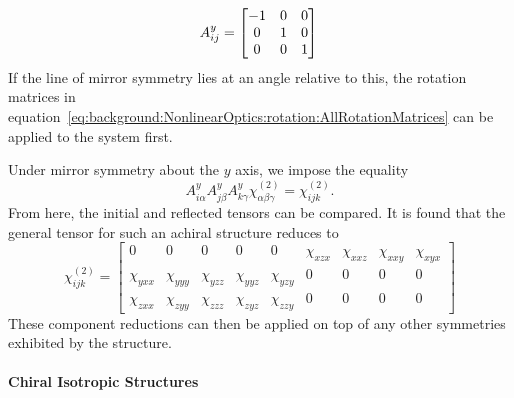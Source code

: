 \begin{equation}\label{eq:background:NonlinearOptics:mirror:yReflect}
	A^{y}_{ij} =
	\begin{bmatrix}
		-1 & 0 & 0\\ 
		0 & 1 & 0\\ 
		0 & 0 & 1
	\end{bmatrix}\\	
\end{equation}
If the line of mirror symmetry lies at an angle relative to this, the rotation matrices in equation~\ref{eq:background:NonlinearOptics:rotation:AllRotationMatrices} can be applied to the system first. 

Under mirror symmetry about the $y$ axis, we impose the equality
\begin{equation}\label{eq:background:NonlinearOptics:mirror:MirrorSymmetry}
	A^{y}_{i\alpha}A^{y}_{j\beta}A^{y}_{k\gamma}\chi^{(2)}_{\alpha \beta \gamma}
	=\chi^{(2)}_{ijk}.
\end{equation}
From here, the initial and reflected tensors can be compared. It is found that the general tensor for such an achiral structure reduces to
\begin{equation}\label{eq:background:NonlinearOptics:mirror:chiMirrory}
	\chi^{(2)}_{ijk} =
	\begin{bmatrix}
		0 & 0 & 0 & 0 & 0 & \chi_{xzx} & \chi_{xxz} & \chi_{xxy} & \chi_{xyx}\\ 
		\chi_{yxx} & \chi_{yyy} & \chi_{yzz} & \chi_{yyz} & \chi_{yzy} & 0 & 0 & 0 & 0\\ 
		\chi_{zxx} & \chi_{zyy} & \chi_{zzz} & \chi_{zyz} & \chi_{zzy} & 0 & 0 & 0 & 0
	\end{bmatrix}
\end{equation}
These component reductions can then be applied on top of any other symmetries exhibited by the structure.

\paragraph{Chiral Isotropic Structures}
\label{sec:ChiralIso}

